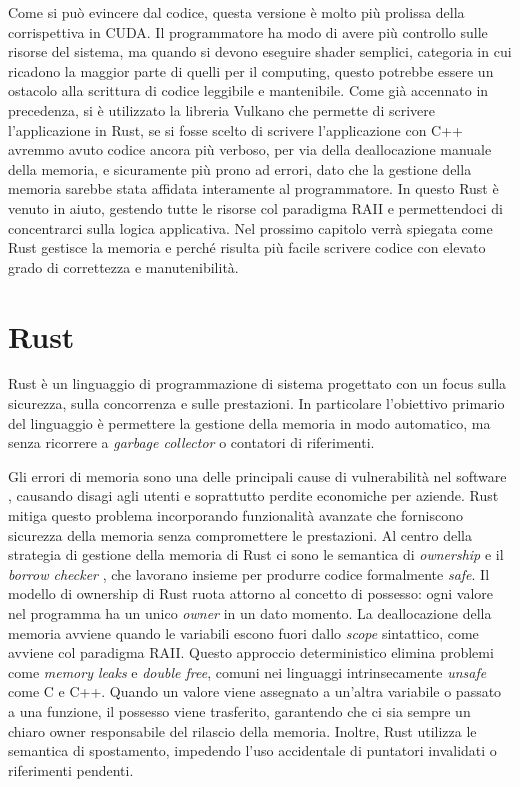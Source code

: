 Come si può evincere dal codice, questa versione è molto più prolissa della corrispettiva in \gls{CUDA}. Il programmatore ha modo di avere più controllo sulle risorse del sistema, ma quando si devono eseguire shader semplici, categoria in cui ricadono la maggior parte di quelli per il computing, questo potrebbe essere un ostacolo alla scrittura di codice leggibile e mantenibile. Come già accennato in precedenza, si è utilizzato la libreria Vulkano che permette di scrivere l'applicazione in Rust, se si fosse scelto di scrivere l'applicazione con C++ avremmo avuto codice ancora più verboso, per via della deallocazione manuale della memoria, e sicuramente più prono ad errori, dato che la gestione della memoria sarebbe stata affidata interamente al programmatore. In questo Rust è venuto in aiuto, gestendo tutte le risorse col paradigma \gls{RAII} e permettendoci di concentrarci sulla logica applicativa. Nel prossimo capitolo verrà spiegata come Rust gestisce la memoria e perché risulta più facile scrivere codice con elevato grado di correttezza e manutenibilità.

\section[Rust]{Rust}

Rust è un linguaggio di programmazione di sistema progettato con un focus sulla sicurezza, sulla concorrenza e sulle prestazioni. In particolare l'obiettivo primario del linguaggio è permettere la gestione della memoria in modo automatico, ma senza ricorrere a \textit{garbage collector} o contatori di riferimenti.

Gli errori di memoria sono una delle principali cause di vulnerabilità nel software \cite[]{Mic:memory_safety}, causando disagi agli utenti e soprattutto perdite economiche per aziende. Rust mitiga questo problema incorporando funzionalità avanzate che forniscono sicurezza della memoria senza compromettere le prestazioni. Al centro della strategia di gestione della memoria di Rust ci sono le semantica di \textit{ownership} e il \textit{borrow checker} \cite[]{Rust:borrow_checker}, che lavorano insieme per produrre codice formalmente \textit{safe}. Il modello di ownership di Rust ruota attorno al concetto di possesso: ogni valore nel programma ha un unico \textit{owner} in un dato momento. La deallocazione della memoria avviene quando le variabili escono fuori dallo \textit{scope} sintattico, come avviene col paradigma \gls{RAII}. Questo approccio deterministico elimina problemi come \textit{memory leaks} e \textit{double free}, comuni nei linguaggi intrinsecamente \textit{unsafe} come C e C++. Quando un valore viene assegnato a un'altra variabile o passato a una funzione, il possesso viene trasferito, garantendo che ci sia sempre un chiaro owner responsabile del rilascio della memoria. Inoltre, Rust utilizza le semantica di spostamento, impedendo l'uso accidentale di puntatori invalidati o riferimenti pendenti.

